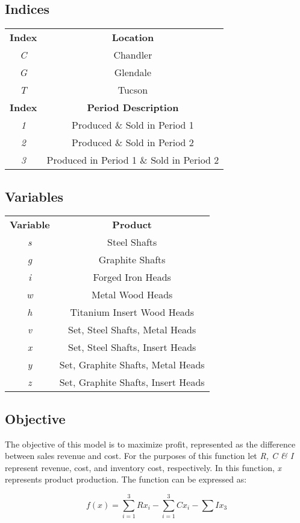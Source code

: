 \documentclass{article}
\begin{document}
\subsection{Indices}
\begin{tabular}{ c c }
\textbf{Index} & \textbf{Location} \\
\textit{C} & Chandler \\
\textit{G} & Glendale \\
\textit{T} & Tucson \\
\textbf{Index} & \textbf{Period Description} \\
\textit{1} & Produced \& Sold in Period 1 \\
\textit{2} & Produced \& Sold in Period 2 \\
\textit{3} & Produced in Period 1 \& Sold in Period 2 \\
\end{tabular}
\subsection{Variables}
\begin{tabular}{ c c }
\textbf{Variable} & \textbf{Product} \\
\textit{s} & Steel Shafts \\
\textit{g} & Graphite Shafts \\
\textit{i} & Forged Iron Heads \\
\textit{w} & Metal Wood Heads \\
\textit{h} & Titanium Insert Wood Heads \\
\textit{v} & Set, Steel Shafts, Metal Heads \\
\textit{x} & Set, Steel Shafts, Insert Heads \\
\textit{y} & Set, Graphite Shafts, Metal Heads \\
\textit{z} & Set, Graphite Shafts, Insert Heads \\
\end{tabular}
\subsection{Objective}
The objective of this model is to maximize profit, represented as the difference between sales revenue and cost.  For the purposes of this function let \textit{R, C \& I} represent revenue, cost, and inventory cost, respectively.  In this function, \textit{x} represents product production.  The function can be expressed as:

$$f(x) = \sum_{i=1}^{3}Rx_{i} - \sum_{i=1}^{3}Cx_{i} - \sum Ix_{3} $$
\end{document}
